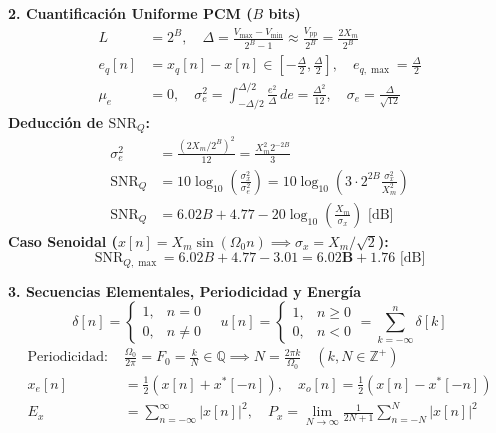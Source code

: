\documentclass[10pt, a4paper, twocolumn]{article}
\begin{document}
\vspace{2pt}
\textbf{2. Cuantificación Uniforme PCM ($B$ bits)}
\begin{align*}
    L &= 2^B, \quad \Delta = \frac{V_{\max} - V_{\min}}{2^B - 1} \approx \frac{V_{\text{pp}}}{2^B} = \frac{2 X_m}{2^B} \\
    e_q[n] &= x_q[n] - x[n] \in \left[-\frac{\Delta}{2}, \frac{\Delta}{2}\right], \quad e_{q,\max} = \frac{\Delta}{2} \\
    \mu_e &= 0, \quad \sigma_e^2 = \int_{-\Delta/2}^{\Delta/2} \frac{e^2}{\Delta} \, de = \frac{\Delta^2}{12}, \quad \sigma_e = \frac{\Delta}{\sqrt{12}}
\end{align*}
\textbf{Deducción de $\text{SNR}_Q$:}
\begin{align*}
    \sigma_e^2 &= \frac{(2 X_m / 2^B)^2}{12} = \frac{X_m^2 2^{-2B}}{3} \\
    \text{SNR}_Q &= 10 \log_{10}\left(\frac{\sigma_x^2}{\sigma_e^2}\right) = 10 \log_{10}\left(3 \cdot 2^{2B} \frac{\sigma_x^2}{X_m^2}\right) \\
    \text{SNR}_Q &= 6.02 B + 4.77 - 20 \log_{10}\left(\frac{X_m}{\sigma_x}\right) \text{ [dB]}
\end{align*}
\textbf{Caso Senoidal ($x[n] = X_m \sin(\Omega_0 n) \implies \sigma_x = X_m / \sqrt{2}$):}
\[
    \text{SNR}_{Q,\max} = 6.02 B + 4.77 - 3.01 = \mathbf{6.02 B + 1.76} \text{ [dB]}
\]

\vspace{2pt}
\textbf{3. Secuencias Elementales, Periodicidad y Energía}
\[
    \delta[n] = \begin{cases} 1, & n = 0 \\ 0, & n \neq 0 \end{cases} \quad u[n] = \begin{cases} 1, & n \ge 0 \\ 0, & n < 0 \end{cases} = \sum_{k=-\infty}^{n} \delta[k]
\]
\begin{align*}
    \text{Periodicidad: } & \frac{\Omega_0}{2\pi} = F_0 = \frac{k}{N} \in \mathbb{Q} \implies N = \frac{2\pi k}{\Omega_0} \quad (k, N \in \mathbb{Z}^+) \\
    x_e[n] &= \frac{1}{2}\left(x[n] + x^*[-n]\right), \quad x_o[n] = \frac{1}{2}\left(x[n] - x^*[-n]\right) \\
    E_x &= \sum_{n=-\infty}^{\infty} |x[n]|^2, \quad P_x = \lim_{N \to \infty} \frac{1}{2N+1} \sum_{n=-N}^{N} |x[n]|^2
\end{align*}
\end{document}
